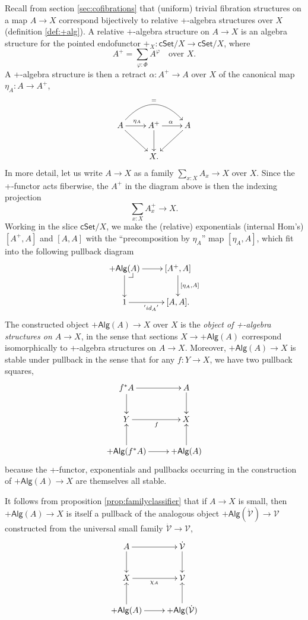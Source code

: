 \documentclass[11pt]{article}
\makeatletter
\newcommand{\cSet}{\ensuremath{\mathsf{cSet}}}
\newcommand{\pbcorner}[1][dr]{\save*!/#1-1.2pc/#1:(-1,1)@^{|-}\restore}
\newcommand{\ra}{\ensuremath{\rightarrow}}
\newcommand{\V}{\ensuremath{\mathcal{V}}}
\newcommand{\VV}{\ensuremath{\dot{\mathcal{V}}}}
\theoremstyle{remark}
\theoremstyle{definition}
\makeatother
\begin{document}
Recall from section \ref{sec:cofibrations} that (uniform) trivial fibration structures on a map $A\ra X$ correspond bijectively to relative +-algebra structures over $X$ (definition \ref{def:+alg}).  A relative $+$-algebra structure on $A \to X$ is an algebra structure for the pointed endofunctor $+_X : \cSet/X \to \cSet/X$, where
\[
A^+ = \sum_{\varphi:\Phi}A^{\varphi}\quad\text{over $X$}.
\]
A +-algebra structure is then a retract $\alpha : A^+\to A$ over $X$ of the canonical map $\eta_A : A\to A^+$,
\[
\xymatrix{
A\ar[rd] \ar[r]^{\eta_A} \ar@/^6ex/ [rr]^= & A^+ \ar[r]^{\alpha} \ar[d]& \ar[ld]A \\
& X. &
}
\]
In more detail, let us write $A\ra X$ as a family $\sum_{x:X}A_x \ra X$ over $X$. Since the +-functor acts fiberwise, the $A^+$ in the diagram above is then the indexing projection
\[
\sum_{x:X}A^+_x \to X.
\]
Working in the slice  $\cSet/X$, we make the (relative) exponentials (internal Hom's) $[A^+, A]$ and $[A, A]$ with the ``precomposition by $\eta_A$'' map $[\eta_A, A]$, which fit into the following pullback diagram 
\[
\xymatrix{
+\mathsf{Alg}(A)\ar[d] \ar[r] \pbcorner & [A^+, A] \ar[d]^{[\eta_A, A]}\\
1 \ar[r]_{'{id_A}'} & [A, A].
}
\]
The constructed object $+\mathsf{Alg}(A) \ra X$ over $X$ is the \emph{object of +-algebra structures on $A\ra X$}, in the sense that sections $X \ra +\mathsf{Alg}(A)$ correspond isomorphically to +-algebra structures on $A\ra X$. Moreover, $+\mathsf{Alg}(A) \ra X$ is stable under pullback in the sense that for any $f:Y\ra X$, we have two pullback squares,
\begin{equation}\label{diagram:pbplus}
\xymatrix{
f^*A \ar[d] \ar[r]  & A \ar[d]\\
Y \ar[r]_{f} &X\\
+\mathsf{Alg}(f^*A)\ar[u] \ar[r] & +\mathsf{Alg}(A)\ar[u].
}
\end{equation}
because the +-functor, exponentials and pullbacks occurring in the construction of $+\mathsf{Alg}(A) \ra X$ are themselves all stable.  

It follows from proposition \ref{prop:familyclassifier} that if $A\ra X$ is small, then $+\mathsf{Alg}(A) \ra X$ is itself a pullback of the analogous object $+\mathsf{Alg}(\VV) \ra \V$ constructed from the universal small family $\VV\ra\V$,
\begin{equation}\label{diagram:tfib1}
\xymatrix{
A \ar[d] \ar[r]  & \VV \ar[d]\\
X \ar[r]_{\chi_A} & \V\\
+\mathsf{Alg}(A)\ar[u] \ar[r] & +\mathsf{Alg}(\VV)\ar[u].
}
\end{equation}
\end{document}
